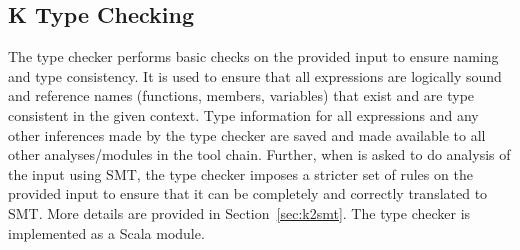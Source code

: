 \subsection{K Type Checking}

The \Klang{} type checker performs basic checks on the provided input
to ensure naming and type consistency. It is used to ensure that all
expressions are logically sound and reference names (functions,
members, variables) that exist and are type consistent in the given
context. Type information for all expressions and any other inferences
made by the type checker are saved and made available to all other
analyses/modules in the \Klang{} tool chain. Further, when \Klang{} is
asked to do analysis of the input using SMT, the type checker imposes
a stricter set of rules on the provided input to ensure that it can be
completely and correctly translated to SMT. More details are provided
in Section~\ref{sec:k2smt}. The type checker is implemented as a Scala
module.
